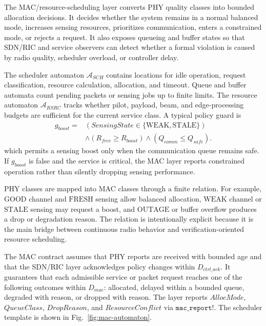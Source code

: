 \documentclass[runningheads]{llncs}
\newcommand{\code}[1]{\texttt{#1}}
\newcommand{\A}[1]{\mathcal{A}_{#1}}
\begin{document}
The MAC/resource-scheduling layer converts PHY quality classes into bounded allocation decisions. It decides whether the system remains in a normal balanced mode, increases sensing resources, prioritizes communication, enters a constrained mode, or rejects a request. It also exposes queueing and buffer states so that SDN/RIC and service observers can detect whether a formal violation is caused by radio quality, scheduler overload, or controller delay.

The scheduler automaton $\A{SCH}$ contains locations for idle operation, request classification, resource calculation, allocation, and timeout. Queue and buffer automata count pending packets or sensing jobs up to finite limits. The resource automaton $\A{RSRC}$ tracks whether pilot, payload, beam, and edge-processing budgets are sufficient for the current service class. A typical policy guard is
\begin{equation}
\begin{aligned}
g_{boost}={}&(SensingState\in\{\mathrm{WEAK},\mathrm{STALE}\})\\
&\wedge (R_{free}\ge R_{boost})\wedge (Q_{comm}\le Q_{safe}).
\end{aligned}
\end{equation}
which permits a sensing boost only when the communication queue remains safe. If $g_{boost}$ is false and the service is critical, the MAC layer reports constrained operation rather than silently dropping sensing performance.

PHY classes are mapped into MAC classes through a finite relation. For example, $\mathrm{GOOD}$ channel and $\mathrm{FRESH}$ sensing allow balanced allocation, $\mathrm{WEAK}$ channel or $\mathrm{STALE}$ sensing may request a boost, and $\mathrm{OUTAGE}$ or buffer overflow produces a drop or degradation reason. The relation is intentionally explicit because it is the main bridge between continuous radio behavior and verification-oriented resource scheduling.

The MAC contract assumes that PHY reports are received with bounded age and that the SDN/RIC layer acknowledges policy changes within $D_{ctrl\_ack}$. It guarantees that each admissible service or packet request reaches one of the following outcomes within $D_{mac}$: allocated, delayed within a bounded queue, degraded with reason, or dropped with reason. The layer reports $AllocMode$, $QueueClass$, $DropReason$, and $ResourceConflict$ via $\code{mac\_report!}$. The scheduler template is shown in Fig.~\ref{fig:mac-automaton}.
\end{document}
